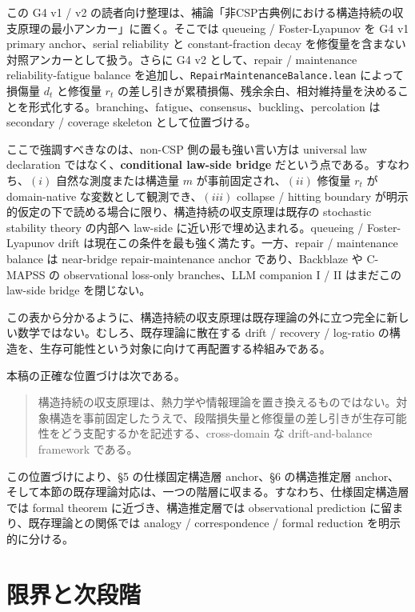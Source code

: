 \documentclass[12pt,a4paper]{article}
\begin{document}
この G4 v1 / v2 の読者向け整理は、補論「非CSP古典例における構造持続の収支原理の最小アンカー」に置く。そこでは queueing / Foster-Lyapunov を G4 v1 primary anchor、serial reliability と constant-fraction decay を修復量を含まない対照アンカーとして扱う。さらに G4 v2 として、repair / maintenance reliability-fatigue balance を追加し、\texttt{RepairMaintenanceBalance.lean} によって損傷量 \(d_{t}\) と修復量 \(r_{t}\) の差し引きが累積損傷、残余余白、相対維持量を決めることを形式化する。branching、fatigue、consensus、buckling、percolation は secondary / coverage skeleton として位置づける。

ここで強調すべきなのは、non-CSP 側の最も強い言い方は universal law declaration ではなく、\textbf{conditional law-side bridge} だという点である。すなわち、\((i)\) 自然な測度または構造量 \(m\) が事前固定され、\((ii)\) 修復量 \(r_{t}\) が domain-native な変数として観測でき、\((iii)\) collapse / hitting boundary が明示的仮定の下で読める場合に限り、構造持続の収支原理は既存の stochastic stability theory の内部へ law-side に近い形で埋め込まれる。queueing / Foster-Lyapunov drift は現在この条件を最も強く満たす。一方、repair / maintenance balance は near-bridge repair-maintenance anchor であり、Backblaze や C-MAPSS の observational loss-only branches、LLM companion I / II はまだこの law-side bridge を閉じない。

この表から分かるように、構造持続の収支原理は既存理論の外に立つ完全に新しい数学ではない。むしろ、既存理論に散在する drift / recovery / log-ratio の構造を、生存可能性という対象に向けて再配置する枠組みである。

本稿の正確な位置づけは次である。

\begin{quote}
構造持続の収支原理は、熱力学や情報理論を置き換えるものではない。対象構造を事前固定したうえで、段階損失量と修復量の差し引きが生存可能性をどう支配するかを記述する、cross-domain な drift-and-balance framework である。
\end{quote}

この位置づけにより、§5 の仕様固定構造層 anchor、§6 の構造推定層 anchor、そして本節の既存理論対応は、一つの階層に収まる。すなわち、仕様固定構造層では formal theorem に近づき、構造推定層では observational prediction に留まり、既存理論との関係では analogy / correspondence / formal reduction を明示的に分ける。

\section{限界と次段階}\label{ux9650ux754cux3068ux6b21ux6bb5ux968e}
\end{document}
